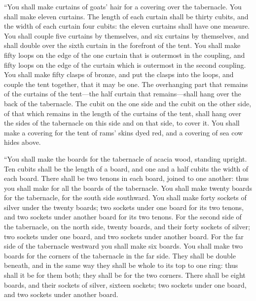  ``You shall make curtains of goats' hair for a covering
over the tabernacle. You shall make eleven curtains.  The
length of each curtain shall be thirty cubits, and the width of each
curtain four cubits: the eleven curtains shall have one measure.
 You shall couple five curtains by themselves, and six
curtains by themselves, and shall double over the sixth curtain in the
forefront of the tent.  You shall make fifty loops on the
edge of the one curtain that is outermost in the coupling, and fifty
loops on the edge of the curtain which is outermost in the second
coupling.  You shall make fifty clasps of bronze, and put
the clasps into the loops, and couple the tent together, that it may be
one.  The overhanging part that remains of the curtains
of the tent---the half curtain that remains---shall hang over the back
of the tabernacle.  The cubit on the one side and the
cubit on the other side, of that which remains in the length of the
curtains of the tent, shall hang over the sides of the tabernacle on
this side and on that side, to cover it.  You shall make
a covering for the tent of rams' skins dyed red, and a covering of sea
cow hides above.

 ``You shall make the boards for the tabernacle of acacia
wood, standing upright.  Ten cubits shall be the length
of a board, and one and a half cubits the width of each board.
 There shall be two tenons in each board, joined to one
another: thus you shall make for all the boards of the tabernacle.
 You shall make twenty boards for the tabernacle, for the
south side southward.  You shall make forty sockets of
silver under the twenty boards; two sockets under one board for its two
tenons, and two sockets under another board for its two tenons.
 For the second side of the tabernacle, on the north
side, twenty boards,  and their forty sockets of silver;
two sockets under one board, and two sockets under another board.
 For the far side of the tabernacle westward you shall
make six boards.  You shall make two boards for the
corners of the tabernacle in the far side.  They shall be
double beneath, and in the same way they shall be whole to its top to
one ring: thus shall it be for them both; they shall be for the two
corners.  There shall be eight boards, and their sockets
of silver, sixteen sockets; two sockets under one board, and two sockets
under another board.

